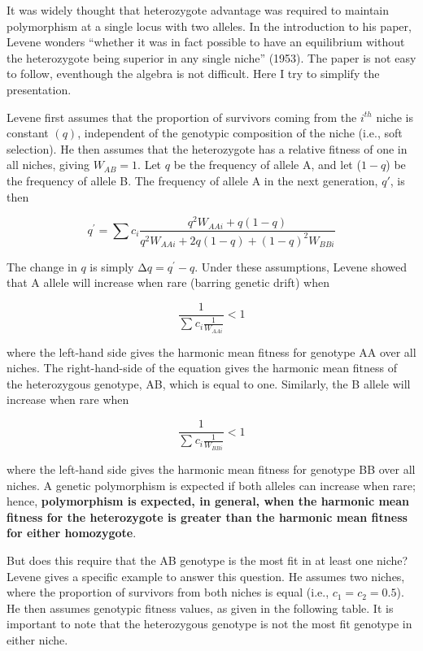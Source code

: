 \documentclass[
  letterpaper,
]{book}
\begin{document}
It was widely thought that heterozygote advantage was required to
maintain polymorphism at a single locus with two alleles. In the
introduction to his paper, Levene wonders ``whether it was in fact
possible to have an equilibrium without the heterozygote being superior
in any single niche'' (1953). The paper is not easy to follow,
eventhough the algebra is not difficult. Here I try to simplify the
presentation.

Levene first assumes that the proportion of survivors coming from the
\(i^{th}\) niche is constant \((q)\), independent of the genotypic
composition of the niche (i.e., soft selection). He then assumes that
the heterozygote has a relative fitness of one in all niches, giving
\(W_{AB} = 1\). Let \(q\) be the frequency of allele A, and let
(\(1 - q\)) be the frequency of allele B. The frequency of allele A in
the next generation, \(q'\), is then

\[q^{'} = \sum_{}^{}c_{i}\frac{q^{2}W_{AAi} + q(1 - q)}{q^{2}W_{AAi} + 2q(1 - q) + (1 - q)^{2}W_{BBi}}\]

The change in \(q\) is simply \(\mathrm{\Delta}q = q^{'} - q\). Under
these assumptions, Levene showed that A allele will increase when rare
(barring genetic drift) when \textbar{}

\[\frac{1}{\sum_{}^{}{c_{i}\frac{1}{W_{AAi}}}} < 1\]

where the left-hand side gives the harmonic mean fitness for genotype AA
over all niches. The right-hand-side of the equation gives the harmonic
mean fitness of the heterozygous genotype, AB, which is equal to one.
Similarly, the B allele will increase when rare when

\[\frac{1}{\sum_{}^{}{c_{i}\frac{1}{W_{BBi}}}} < 1\]

where the left-hand side gives the harmonic mean fitness for genotype BB
over all niches. A genetic polymorphism is expected if both alleles can
increase when rare; hence, \textbf{polymorphism is expected, in general,
when the harmonic mean fitness for the heterozygote is greater than the
harmonic mean fitness for either homozygote}.

But does this require that the AB genotype is the most fit in at least
one niche? Levene gives a specific example to answer this question. He
assumes two niches, where the proportion of survivors from both niches
is equal (i.e., \(c_{1} = c_{2} = 0.5\)). He then assumes genotypic
fitness values, as given in the following table. It is important to note
that the heterozygous genotype is not the most fit genotype in either
niche.
\end{document}
